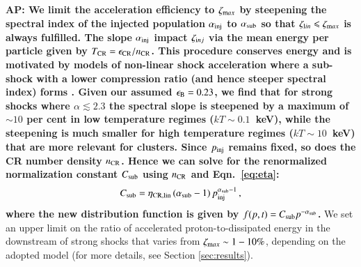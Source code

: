 \documentclass[a4paper,fleqn,usenatbib]{mnras}
\newcommand\eb{\epsilon_\rmn{B}}
\def\AP#1{{\bf  AP: #1}}
\begin{document}
\AP{We limit the acceleration efficiency to $\zeta_{{\mathrm{m}}ax}$ by
  steepening the spectral index of the injected population
  $\alpha_{\mathrm{inj}}$ to $\alpha_{\mathrm{sub}}$ so that $\zeta_{{\mathrm{l}}in}
  \leqslant \zeta_{{\mathrm{m}}ax}$ is always fulfilled. The slope
  $\alpha_{\mathrm{inj}}$ impact $\zeta_{{\mathrm{i}}nj}$ via the mean energy per
  particle given by $T_{\mathrm{CR}} = \epsilon_{\mathrm{CR}}/n_{\mathrm{CR}}$. This
  procedure conserves energy and is motivated by models of non-linear
  shock acceleration where a sub-shock with a lower compression ratio
  (and hence steeper spectral index) forms
  \citep[e.g.,][]{2000ApJ...540..292E}. Given our assumed $\eb=0.23$,
  we find that for strong shocks where $\alpha \lesssim 2.3$ the
  spectral slope is steepened by a maximum of $\sim 10$ per cent in
  low temperature regimes ($kT\sim 0.1$~keV), while the steepening is
  much smaller for high temperature regimes ($kT\sim 10$~keV) that are
  more relevant for clusters. Since $p_{\rm inj}$ remains fixed, so
  does the CR number density $n_{\mathrm{CR}}$. Hence we can solve for the
  renormalized normalization constant $C_{\mathrm{sub}}$ using $n_{\mathrm{CR}}$
  and Eqn.~\ref{eq:eta}:
\begin{equation}
  \label{eq:Cp_sub}
  C_{\mathrm{sub}}=\eta_{\mathrm{CR,lin}}\,(\alpha_{\mathrm{sub}}-1)\,p_{\mathrm{inj}}^{\alpha_{\mathrm{sub}}-1}\,,
\end{equation}
where the new distribution function is given by $f(p,t)= C_{\mathrm{sub}}
p^{-\alpha_{\mathrm{sub}}}$.} We set an upper limit on the ratio of
accelerated proton-to-dissipated energy in the downstream of strong
shocks that varies from $\zeta_{{\mathrm{m}}ax} \sim 1-10\%$, depending on
the adopted model (for more details, see Section \ref{sec:results}).
\end{document}
